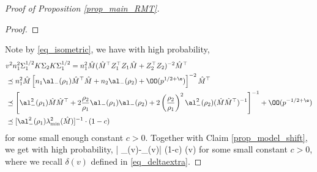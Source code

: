 \documentclass[aos,preprint]{imsart}
\begin{document}
\begin{proof}[Proof of Proposition \ref{prop_main_RMT}]
{\begin{proof}
\end{proof}
Note by \eqref{eq_isometric}, we have with high probability,
\begin{align*}
&v^2 n_1^2 \Sigma_1^{1/2} K \Sigma_2 K \Sigma_1^{1/2} =n_1^2 \hat M (\hat M^\top Z_1^\top Z_1 \hat M + Z_2^\top Z_2)^{-2}\hat M^\top \\
&\preceq  n_1^2 \hat M \left[n_1 \al_-(\rho_1)\hat M^\top \hat M + n_2 \al_-(\rho_2) + \OO(p^{1/2+\e})\right]^{-2}\hat M^\top \\
&\preceq  \left[ \al_-^2(\rho_1) \hat M\hat M^\top + 2\frac{\rho_2}{\rho_1} \al_-(\rho_1)\al_-(\rho_2) + 2\left(\frac{\rho_2}{\rho_1}\right)^2 \al_-^2(\rho_2) (\hat M \hat M^\top )^{-1}\right]^{-1}+  \OO(p^{-1/2+\e}) \\
&\preceq [\al_-^2(\rho_1) \lambda_{\min}^2(\hat M)]^{-1}\cdot (1 - c)
\end{align*}
for some small enough constant $c>0$. Together with Claim \ref{prop_model_shift}, we get with high probability,
\be\label{bounddelta-}
\left| \delta_{\bias}(v)-\wt\delta_{\bias}(v)\right| 
		\le (1-c) \delta(v)
\ee
for some small constant $c>0$, where we recall $\delta(v)$ defined in \eqref{eq_deltaextra}.
			}


\end{proof}
\end{document}

